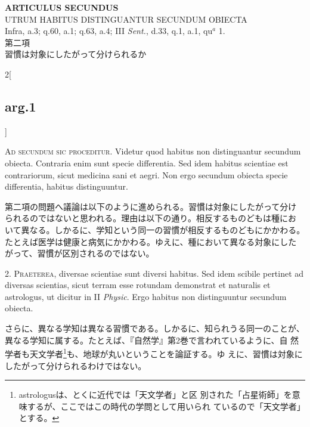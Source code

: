 \documentclass[paper=a4paper,fontsize=10pt,jafontsize=9pt,titlepage]{jlreq}
\begin{document}
\begin{center}
{\Large {\bfseries ARTICULUS SECUNDUS}}\\
{\large UTRUM HABITUS DISTINGUANTUR SECUNDUM OBIECTA}\\
{\footnotesize Infra, a.3; q.60, a.1; q.63, a.4; III {\itshape Sent.}, d.33, q.1, a.1, qu$^{a}$ 1.}\\
{\Large 第二項\\習慣は対象にしたがって分けられるか}
\end{center}

\begin{paracol}{2}[\subsection{arg.1}]

{\scshape Ad secundum sic proceditur}. Videtur quod habitus non
distinguantur secundum obiecta. Contraria enim sunt specie
differentia. Sed idem habitus scientiae est contrariorum, sicut
medicina sani et aegri. Non ergo secundum obiecta specie differentia,
habitus distinguuntur.

\switchcolumn

第二項の問題へ議論は以下のように進められる。習慣は対象にしたがって分け
られるのではないと思われる。理由は以下の通り。相反するものどもは種にお
いて異なる。しかるに、学知という同一の習慣が相反するものどもにかかわる。
たとえば医学は健康と病気にかかわる。ゆえに、種において異なる対象にした
がって、習慣が区別されるのではない。


2. {\scshape Praeterea}, diversae scientiae sunt diversi habitus. Sed
idem scibile pertinet ad diversas scientias, sicut terram esse
rotundam demonstrat et naturalis et astrologus, ut dicitur in II
{\itshape Physic}. Ergo habitus non distinguuntur secundum obiecta.

\switchcolumn

さらに、異なる学知は異なる習慣である。しかるに、知られうる同一のことが、
異なる学知に属する。たとえば、『自然学』第2巻で言われているように、自
然学者も天文学者\footnote{astrologusは、とくに近代では「天文学者」と区
別された「占星術師」を意味するが、ここではこの時代の学問として用いられ
ているので「天文学者」とする。}も、地球が丸いということを論証する。ゆ
えに、習慣は対象にしたがって分けられるわけではない。


\end{paracol}
\end{document}
